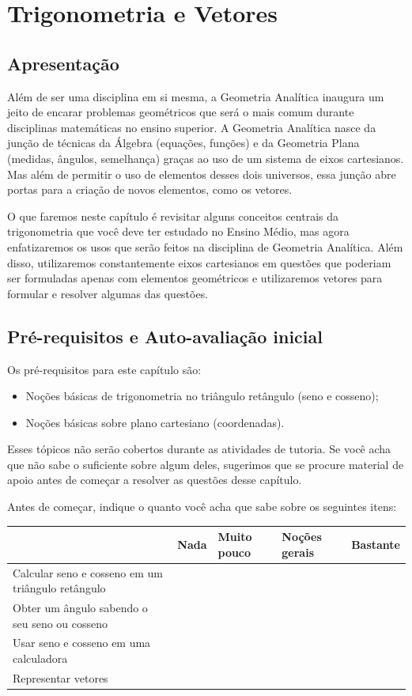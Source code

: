 \documentclass[main.tex]{subfiles}
\begin{document}
\chapter{Trigonometria e Vetores}

\section{Apresentação}

Além de ser uma disciplina em si mesma, a Geometria Analítica inaugura um jeito de encarar problemas geométricos que será o mais comum durante disciplinas matemáticas no ensino superior. A Geometria Analítica nasce da junção de técnicas da Álgebra (equações, funções) e da Geometria Plana (medidas, ângulos, semelhança) graças ao uso de um sistema de eixos cartesianos. Mas além de permitir o uso de elementos desses dois universos, essa junção abre portas para a criação de novos elementos, como os vetores.

O que faremos neste capítulo é revisitar alguns conceitos centrais da trigonometria que você deve ter estudado no Ensino Médio, mas agora enfatizaremos os usos que serão feitos na disciplina de Geometria Analítica. Além disso, utilizaremos constantemente eixos cartesianos em questões que poderiam ser formuladas apenas com elementos geométricos e utilizaremos vetores para formular e resolver algumas das questões.

\newpage

\section{Pré-requisitos e Auto-avaliação inicial}

Os pré-requisitos para este capítulo são:
\begin{itemize}
 \item Noções básicas de trigonometria no triângulo retângulo (seno e cosseno);
 \item Noções básicas sobre plano cartesiano (coordenadas).
\end{itemize}

Esses tópicos não serão cobertos durante as atividades de tutoria. Se você acha que não sabe o suficiente sobre algum deles, sugerimos que se procure material de apoio antes de começar a resolver as questões desse capítulo.

Antes de começar, indique o quanto você acha que sabe sobre os seguintes itens:

\begin{center}
 \begin{tabular}{|p{35mm}||p{15mm}|p{15mm}|p{15mm}|p{15mm}|} 
 \hline
   & Nada & Muito pouco & Noções gerais & Bastante\\
 \hline
 Calcular seno e cosseno em um triângulo retângulo &  &  &  &  \\ 
 \hline
 Obter um ângulo sabendo o seu seno ou cosseno &  &  &  &  \\
 \hline
 Usar seno e cosseno em uma calculadora &  &  &  &  \\
 \hline
 Representar vetores &  &  &  &  \\
 \hline
\end{tabular}
\end{center}
\end{document}
